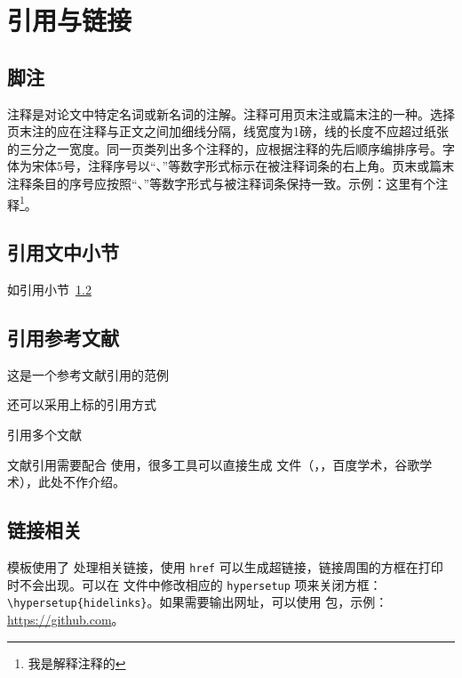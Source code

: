 
\chapter{引用与链接}

\section{脚注}
注释是对论文中特定名词或新名词的注解。注释可用页末注或篇末注的一种。选择页末注的应在注释与正文之间加细线分隔，线宽度为1磅，线的长度不应超过纸张的三分之一宽度。同一页类列出多个注释的，应根据注释的先后顺序编排序号。字体为宋体5号，注释序号以“、”等数字形式标示在被注释词条的右上角。页末或篇末注释条目的序号应按照“、”等数字形式与被注释词条保持一致。示例：这里有个注释\footnote{我是解释注释的}。

\section{引用文中小节}\label{sec:ref}
如引用小节~\ref{sec:ref}

\section{引用参考文献}
这是一个参考文献引用的范例\cite{kuhn2004man}

还可以采用上标的引用方式

引用多个文献\cite{kuhn2004man,江泽民2008新时期我国信息技术产业的发展,江泽民1989能源发展趋势及主要节能措施}

文献引用需要配合  使用，很多工具可以直接生成  文件（，，百度学术，谷歌学术），此处不作介绍。

\section{链接相关}
模板使用了  处理相关链接，使用 \verb|href| 可以生成超链接，链接周围的方框在打印时不会出现。可以在  文件中修改相应的 \verb|hypersetup| 项来关闭方框：\verb|\hypersetup{hidelinks}|。如果需要输出网址，可以使用  包，示例：\url{https://github.com}。
